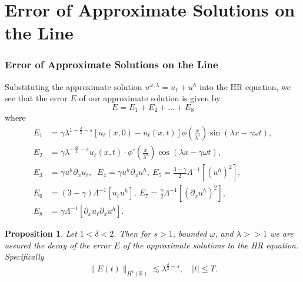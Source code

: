 \documentclass{beamer}
\newcommand{\rr}{\mathbb{R}}
\newcommand{\p}{\partial}
\newtheorem{proposition}{Proposition}
\begin{document}
\section{Error of Approximate Solutions on the Line}
\begin{frame}
	\frametitle{Error of Approximate Solutions on the Line}
Substituting the
approximate solution $u^{\omega, \lambda} = u_\ell + u^h$ into the HR
equation, we see that the error
$E$ of our approximate solution is given by
%
%
\begin{equation*}
E=E_1 + E_2 + \dots + E_8
\end{equation*}
%
%
\pause
where
%
%
\begin{equation*}
\label{all_errors_together}
\begin{split}
E_1 & = \gamma \lambda^{1 -\frac{\delta}{2}-s}  \left[ u_\ell(x,0) - u_\ell(x,t)
\right] \phi\left(
\frac{x}{\lambda^ \delta}
\right)\sin(\lambda x - \gamma \omega t),
\\
E_2 & = \gamma \lambda^{-\frac{3\delta}{2}-s}
u_\ell(x,t) \cdot \phi'\left( \frac{x}{\lambda^\delta} \right)\cos\left( \lambda
x - \gamma \omega t
\right),
\\
E_3 & = \gamma u^h \p_x u_\ell, \; \; E_4 = \gamma u^h \p_x u^h, \ E_5  = 
 \frac{3-\gamma}{2} \Lambda^{-1} \left[  \left( u^h \right)^2 \right], \\
E_6 & = (3- \gamma)\Lambda^{-1}
  \left[ u_\ell u^h \right], \  E_7 = \frac{\gamma}{2} \Lambda^{-1} \left[ 
 \left(
\p_x u^h \right)^2 \right ], \; \;
\\
E_8 & = \gamma \Lambda^{-1} \left[  \p_x u_\ell \p_x u^h \right]
.
\end{split}
\end{equation*}
%
%
\end{frame}
%
%
%
\begin{frame}
%
%
\begin{proposition}
Let $1<\delta<2$. Then for $s > 1$, bounded $\omega$, and
$\lambda >>1$ we are assured the decay of the error $E$ of the
approximate solutions to the HR equation. Specifically
%
%
%
\begin{equation*}
\label{E-est}
\|E(t)\|_{H^1(\rr)} \lesssim \lambda^{\frac{\delta}{2} -s}, \quad |t| \le 
T.
\end{equation*}
%
%
%
\end{proposition}
%
%
\end{frame}
%
%
\end{document}
